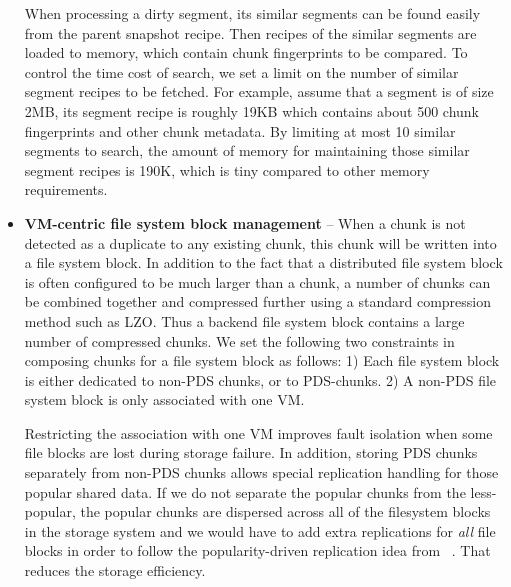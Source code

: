 \begin{itemize}
When processing a dirty segment,
its  similar segments can be found easily from the
parent snapshot recipe.  Then recipes of the similar segments are loaded to memory,
which contain chunk fingerprints to be compared.
To control the time cost of search, we set a limit on the number of  similar segment recipes to be fetched. 
For example, assume that  a segment is of size  2MB, 
its segment recipe is roughly 19KB which contains about 500 chunk fingerprints and other chunk metadata.
By limiting at most 10 similar segments to search, the amount of memory for maintaining those 
similar segment recipes is 190K, which is tiny compared to other memory requirements.


\item 
\textbf{VM-centric file system block management} --
When a chunk is not detected as a duplicate to any existing chunk, this chunk will be written
into a file system block.  
In addition to the fact that a distributed file system block is often
configured to be much  larger than a chunk, a number of chunks can be combined together
and compressed further using a standard compression method such as LZO. 
Thus a  backend file system block contains a large number of compressed chunks.
We set the following two constraints in composing chunks for a file system block as follows:
1) Each file system block is either dedicated to non-PDS chunks, or to PDS-chunks.
2) A non-PDS file system block is only associated with one VM.

Restricting the association with one VM improves fault isolation when some file blocks are lost during 
storage failure. 
In addition, storing PDS chunks separately from non-PDS chunks
allows special replication handling for those popular shared data. 
If we do not separate the
popular chunks from the less-popular, the popular chunks are dispersed across
all of the filesystem blocks in the storage system and we would have
to add extra replications for {\em all} file blocks in order to   follow the popularity-driven replication idea 
from ~\cite{Reliability06}. That reduces the storage efficiency.


\end{itemize}
